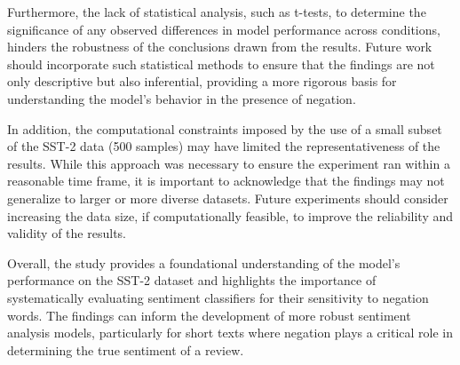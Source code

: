 \documentclass{article}
\begin{document}
Furthermore, the lack of statistical analysis, such as t-tests, to determine the significance of any observed differences in model performance across conditions, hinders the robustness of the conclusions drawn from the results. Future work should incorporate such statistical methods to ensure that the findings are not only descriptive but also inferential, providing a more rigorous basis for understanding the model's behavior in the presence of negation.

In addition, the computational constraints imposed by the use of a small subset of the SST-2 data (500 samples) may have limited the representativeness of the results. While this approach was necessary to ensure the experiment ran within a reasonable time frame, it is important to acknowledge that the findings may not generalize to larger or more diverse datasets. Future experiments should consider increasing the data size, if computationally feasible, to improve the reliability and validity of the results.

Overall, the study provides a foundational understanding of the model's performance on the SST-2 dataset and highlights the importance of systematically evaluating sentiment classifiers for their sensitivity to negation words. The findings can inform the development of more robust sentiment analysis models, particularly for short texts where negation plays a critical role in determining the true sentiment of a review.
\end{document}
